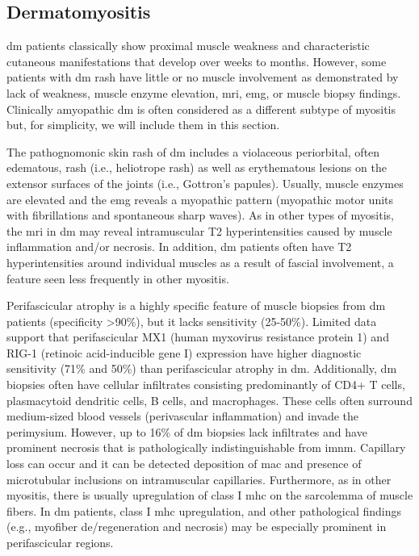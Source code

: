 \subsection{Dermatomyositis}

\gls{dm} patients classically show proximal muscle weakness and characteristic cutaneous manifestations that develop over weeks to months. However, some patients with \gls{dm} rash have little or no muscle involvement as demonstrated by lack of weakness, muscle enzyme elevation, \gls{mri}, \gls{emg}, or muscle biopsy findings. Clinically amyopathic \gls{dm} is often considered as a different subtype of myositis\cite{Sontheimer2002} but, for simplicity, we will include them in this section.

The pathognomonic skin rash of \gls{dm} includes a violaceous periorbital, often edematous, rash (i.e., heliotrope rash) as well as erythematous lesions on the extensor surfaces of the joints (i.e., Gottron’s papules). Usually, muscle enzymes are elevated and the \gls{emg} reveals a myopathic pattern (myopathic motor units with fibrillations and spontaneous sharp waves). As in other types of myositis, the \gls{mri} in \gls{dm} may reveal intramuscular T2 hyperintensities caused by muscle inflammation and/or necrosis.\cite{PinalFernandez2017} In addition, \gls{dm} patients often have T2 hyperintensities around individual muscles as a result of fascial involvement, a feature seen less frequently in other myositis.\cite{PinalFernandez2017} 

Perifascicular atrophy is a highly specific feature of muscle biopsies from \gls{dm} patients (specificity >90\%), but it lacks sensitivity (25-50\%).\cite{SuarezCalvet2017,PinalFernandez2015} Limited data support that perifascicular MX1 (human myxovirus resistance protein 1) and RIG-1 (retinoic acid-inducible gene I) expression have higher diagnostic sensitivity (71\% and 50\%) than perifascicular atrophy in \gls{dm}.\cite{SuarezCalvet2017,Uruha2017} Additionally, \gls{dm} biopsies often have cellular infiltrates consisting predominantly of CD4+ T cells, plasmacytoid dendritic cells, B cells, and macrophages.\cite{Dalakas2002} These cells often surround medium-sized blood vessels (perivascular inflammation) and invade the perimysium.\cite{Dalakas2002} However, up to 16\% of \gls{dm} biopsies lack infiltrates and have prominent necrosis that is pathologically indistinguishable from \gls{imnm}.\cite{PinalFernandez2015} Capillary loss can occur and it can be detected deposition of \gls{mac} and presence of microtubular inclusions on intramuscular capillaries.\cite{Dalakas2002} Furthermore, as in other myositis, there is usually upregulation of class I \gls{mhc} on the sarcolemma of muscle fibers. In \gls{dm} patients, class I \gls{mhc} upregulation, and other pathological findings (e.g., myofiber de/regeneration and necrosis) may be especially prominent in perifascicular regions.\cite{Dalakas2002}

